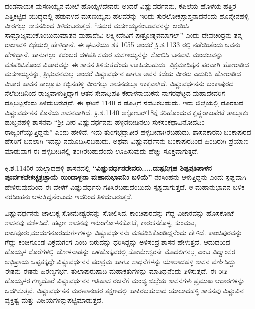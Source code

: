 ದಂಡನಾಯಕ ಮಸಣಯ್ಯನ ಮೇಲೆ ಹೊಯ್ಸಳದೇವರು ಅಂದರೆ ವಿಷ್ಣುವರ್ಧನನು, ಕಪಿಲೆಯ ಹೊಳೆಯ ಹತ್ತಿರ ಎತ್ತಿಕಟ್ಟಿದ ಯುದ್ಧದಲ್ಲಿ ಹಡುವಳದ ಮಸಣಯ್ಯನು ಹಲವರನ್ನು ಇರಿದು ಸುರಲೋಕಪ್ರಾಪ್ತನಾದನೆಂದು ಹೊನ್ನೇನಹಳ್ಳಿ ವೀರಗಲ್ಲು ಶಾಸನದಿಂದ ತಿಳಿದುಬರುತ್ತದೆ. “ಸಮರ ಮಸಣಯ್ಯನೆಂಬುವವನನ್ನು ಜಯಿಸಿ ಸಾಮ್ರಾಜ್ಯಮಂ\break ಕೊಂಬುದುಮಾತನ ಮಹಾದೇವಿ ಲಕ್ಷ್ಮೀದೇವಿಗೆ ಪುತ್ರೋತ್ಸವಮಾಗಲ್​” ಎಂದು ದೇವಚಂದ್ರನು ತನ್ನ ರಾಜಾವಳಿ ಕಥೆಯಲ್ಲಿ ಹೇಳಿದ್ದಾನೆ. ಈ ಘಟನೆಯು ಶಕ 1055 ಅಂದರೆ ಕ್ರಿ.ಶ.1133 ರಲ್ಲಿ ನಡೆಯಿತೆಂದು ಅವನು ಹೇಳಿದ್ದಾನೆ. ಹಾನುಗಲ್ಲು ಕದಂಬರ ದಳಪತಿ ಸಮರ ಮಸಣಯ್ಯನನ್ನು ಸೋಲಿಸಿ ಬನವಾಸಿ ಮಂಡಲವನ್ನು ವಶಪಡಿಸಿಕೊಂಡ ವಿಚಾರವನ್ನು ಈ ಶಾಸನ ತಿಳಿಸುತ್ತದೆಂದು ಊಹಿಸಬಹುದು. ವಿಕ್ರಮಾದಿತ್ಯನ ಪರವಾಗಿ ಹೋರಾಡಿದ ಮಸಣಯ್ಯನನ್ನು, ತ್ರಿಭುವನಮಲ್ಲ ಅಂದರೆ ವಿಷ್ಣುವರ್ಧನ ಹಾಗೂ ಅವನ ಕಡೆಯ ವೀರರು ಎದುರಿಸಿ ಹೋರಾಡಿದ ವಿಚಾರ ಹಾಸನ ತಾಲ್ಲೂಕು ಕಬ್ಬಿನಹಳ್ಳಿ ವೀರಗಲ್ಲು ಶಾಸನದಲ್ಲೂ ಉಕ್ತವಾಗಿದೆ. ವಿಷ್ಣುವರ್ಧನನು ಬಂಕಾಪುರದ ನೆಲೆಬೀಡಿನಿಂದ ರಾಜ್ಯವಾಳುತ್ತಿದ್ದಾಗ ಆತನ ಸೇನಾಧಿಪತಿ ಕೇರಾಳನಾಯಕನು ನಾಗರಘಟ್ಟದ ಮಹಾದೇವರಿಗೆ ದತ್ತಿಬಿಟ್ಟನೆಂದು ತಿಳಿದುಬರುತ್ತದೆ. ಈ ಘಟನೆ 1140 ರ ಹೊತ್ತಿಗೆ ನಡೆದಿರಬಹುದು. ಇದು ಜಿಲ್ಲೆಯಲ್ಲಿ ದೊರಕುವ ವಿಷ್ಣುವರ್ಧನನ ಕೊನೆಯ ಶಾಸನವಾಗಿದೆ. ಕ್ರಿ.ಶ.1140 ಅಕ್ಟೋಬರ್​ 18ಕ್ಕೆ ಸರಿಹೊಂದುವ ಕೃಷ್ಣರಾಜಪೇಟೆ ತಾಲ್ಲೂಕು ಹುಬ್ಬನಹಳ್ಳಿ ಶಾಸನವು “ಶ‍್ರೀ ವೀರ ವಿಷ್ಣುವರ್ಧನನು ಹಳ್ಳದಬೀಡಿನಲು ಸುಕಸಂಕಥಾವಿನೋದದಿಂ ರಾಜ್ಯಂಗೆಯ್ಯುತ್ತಿದ್ದನು” ಎಂದು ಹೇಳಿದೆ. ಇದು ತುಂಗಭದ್ರಾತೀರ ಹಳ್ಳಬೀಡಾಗಿರಬಹುದು. ಶಾಸನಕಾರನು ಬಂಕಾಪುರದ ಹೆಸರಿಗೆ ಬದಲಾಗಿ ಇದನ್ನು ನಮೂದಿಸಿರಬಹುದು. ಅಥವಾ ವಿಷ್ಣುವರ್ಧನನು ಬಂಕಾಪುರದಿಂದ ಹಿಂದಿರುಗಿ ಪ್ರಯಾಣ ಮಾಡುವಾಗ ಈ ಹಳ್ಳಬೀಡಿನಲ್ಲಿ ತಂಗಿರಬಹುದೆಂದು ಊಹಿಸುವುದು ಹೆಚ್ಚು ಸೂಕ್ತವಾಗುತ್ತದೆ.

ಕ್ರಿ.ಶ.1145ರ ಯಲ್ಲಾದಹಳ್ಳಿ ಶಾಸನದಲ್ಲಿ \textbf{“ವಿಷ್ಣುವರ್ಧನದೇವರು.....ದುಷ್ಟನಿಗ್ರಹ ಶಿಷ್ಟಪ್ರತಿಪಾಳನ\general{\break } ಪೂರ್ವಕವೇಕಚ್ಛತ್ರಚ್ಛಾಯೆ ಯಿಂದಾಳ್ದನಾ ಮಹಾನುಭಾವನಿಂ ಬಳಿಯೆ”} ನರಸಿಂಹನು ಆಳುತ್ತಿದ್ದನು ಎಂದು ಸ್ಪಷ್ಟವಾಗಿ ಹೇಳಿರುವುದರಿಂದ ಈ ವೇಳೆಗೆ ವಿಷ್ಣುವರ್ಧನು ಗತಿಸಿರಬಹುದೆಂಬುದು ಸ್ಪಷ್ಟವಾಗುತ್ತದೆ. ಆ ಮಹಾನುಭಾವನ ಬಳಿಕ ನರಸಿಂಹನು ಆಳುತ್ತಿದ್ದನೆಂಬುದು ಇದರಿಂದ ತಿಳಿದುಬರುತ್ತದೆ.

ವಿಷ್ಣುವರ್ಧನನು ಚಾಲುಕ್ಯ ಸೋಮೇಶ್ವರನನ್ನು ಸೋಲಿಸಿದ, ಕಾಂಚಿಪುರವನ್ನು ಗೆದ್ದ ವಿಚಾರವನ್ನು ಹೊಸಕೋಟೆ ಶಾಸನವು ವರ್ಣಿಸಿದೆ. ಹಟ್ಟಣ ಶಾಸನವು ಇರುಂಗೋಳನಕೋಟೆ, ಕಾರುಕನಕೊಳ್ಳ, ಕುಂಮಟ, ರಾಚವೂರು,\break ಮುದುಗನೂರುದುರ್ಗ\-ಗಳನ್ನು ವಿಷ್ಣುವರ್ಧನನು ವಶಪಡಿಸಿಕೊಂಡಿದ್ದನೆಂದು ಹೇಳಿದೆ. ಕಾಂಚಿಪುರವನ್ನು ಗೆದ್ದು ಕಂಚಿಗೊಂಡ ವಿಕ್ರಮಗಂಗ ಎಂಬ ಬಿರುದನ್ನು ಧರಿಸಿದ್ದನ್ನು ಅಳಿಸಂದ್ರ ಶಾಸನ ಹೇಳುತ್ತದೆ. ಆದುದರಿಂದ ಹೊಯ್ಸಳ ದೊರೆಗಳಲ್ಲಿ ಚೋಳನಾಡನ್ನು ಒಳಹೊಕ್ಕವರಲ್ಲಿ ಸೋಮೇಶ್ವರನೇ ಮೊದಲಿಗನಲ್ಲ ಎಂಬ ವಿದ್ವಾಂಸರ ಅಭಿಪ್ರಾಯ ಒಪ್ಪತಕ್ಕದ್ದೇ.\break ವಿಷ್ಣುವರ್ಧನನ ಪರಾಕ್ರಮ ಹಾಗೂ ಸಾಧನೆಗಳನ್ನು ಯಾಲಾದಹಳ್ಳಿ ಶಾಸನ ವರ್ಣಿಸಿದ್ದು ಈತನು ಈತನು ಹಿರಣ್ಯಗರ್ಭ, ತುಲಾಪುರುಷಾದಿ ಮಹಾಕ್ರತುಗಳನ್ನು ಮಾಡಿದ್ದನೆಂದು ತಿಳಿಸುತ್ತದೆ. ಈ ರೀತಿ ಹೊಯ್ಸಳರ ಗಣ್ಯದೊರೆ ವಿಷ್ಣುವರ್ಧನನ ಇತಿಹಾಸ ರಚನೆಗೆ ಮಂಡ್ಯ ಜಿಲ್ಲೆಯ ಶಾಸನಗಳು ಪ್ರಮುಖ ಆಧಾರಗಳನ್ನು ಒದಗಿಸುತ್ತವೆ. ವಿಷ್ಣುವರ್ಧನನ ಮರಣಾನಂತರ ತಕ್ಷಣದಲ್ಲಿ ಹಾಕಿರಬಹುದಾದ ಯಾಲಾದಹಳ್ಳಿ ಶಾಸನವು ವಿಷ್ಣುವಿನ ವ್ಯಕ್ತಿತ್ವ ಮತ್ತು ವಿಜಯಗಳನ್ನು\break ಪಟ್ಟಿಮಾಡುತ್ತದೆ.

